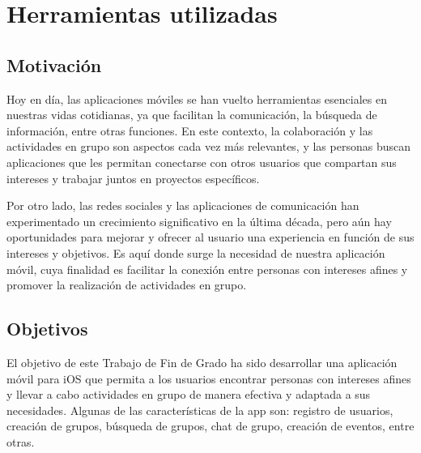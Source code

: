 \chapter{Herramientas utilizadas}
\section{Motivación}
Hoy en día, las aplicaciones móviles se han vuelto herramientas 
esenciales en nuestras vidas cotidianas, ya que facilitan la 
comunicación, la búsqueda de información, entre otras funciones. 
En este contexto, la colaboración y las actividades en grupo son 
aspectos cada vez más relevantes, y las personas buscan aplicaciones 
que les permitan conectarse con otros usuarios que compartan sus 
intereses y trabajar juntos en proyectos específicos.

Por otro lado, las redes sociales y las aplicaciones de comunicación 
han experimentado un crecimiento significativo en la última década, 
pero aún hay oportunidades para mejorar y ofrecer al usuario una experiencia en función de sus intereses y objetivos. Es aquí donde 
surge la necesidad de nuestra aplicación móvil, cuya finalidad es 
facilitar la conexión entre personas con intereses afines y promover 
la realización de actividades en grupo.

\section{Objetivos}
El objetivo de este Trabajo de Fin de Grado ha sido desarrollar una 
aplicación móvil para iOS que permita a los usuarios 
encontrar personas con intereses afines y llevar a cabo actividades 
en grupo de manera efectiva y adaptada a sus necesidades. Algunas 
de las características de la app son: registro de usuarios, creación 
de grupos, búsqueda de grupos, chat de grupo, creación de eventos, entre otras.

\begin{comment}
Para satisfacer las necesidades de los usuarios, se ha diseñado una 
interfaz amigable y funcional que facilite la interacción y el uso de 
la aplicación.
\end{comment}
